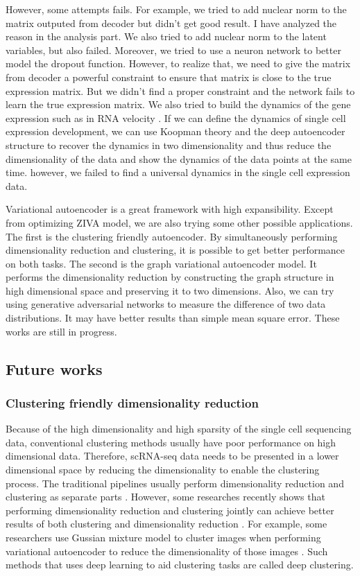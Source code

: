 However, some attempts fails. For example, we tried to add nuclear norm to the matrix outputed from decoder but didn't get good result. I have analyzed the reason in the analysis part. We also tried to add nuclear norm to the latent variables, but also failed. Moreover, we tried to use a neuron network to better model the dropout function. However, to realize that, we need to give the matrix from decoder a powerful constraint to ensure that matrix is close to the true expression matrix. But we didn't find a proper constraint and the network fails to learn the true expression matrix. We also tried to build the dynamics of the gene expression such as in RNA velocity \cite{la2018rna}. If we can define the dynamics of single cell expression development, we can use Koopman theory \cite{morton2018deep} and the deep autoencoder structure to recover the dynamics in two dimensionality \cite{lusch2018deep} and thus reduce the dimensionality of the data and show the dynamics of the data points at the same time. however, we failed to find a universal dynamics in the single cell expression data.  

Variational autoencoder is a great framework with high expansibility. Except from optimizing ZIVA model, we are also trying some other possible applications. The first is the clustering friendly autoencoder. By simultaneously performing dimensionality reduction and clustering, it is possible to get better performance on both tasks. The second is the graph variational autoencoder model. It performs the dimensionality reduction by constructing the graph structure in high dimensional space and preserving it to two dimensions. Also, we can try using generative adversarial networks to measure the difference of two data distributions. It may have better results than simple mean square error. These works are still in progress.

\subsection{Future works}

\subsubsection{Clustering friendly dimensionality reduction}
Because of the high dimensionality and high sparsity of the single cell sequencing data, conventional clustering methods usually have poor performance on high dimensional data. Therefore, scRNA-seq data needs to be presented in a lower dimensional space by reducing the dimensionality to enable the clustering process. The traditional pipelines usually perform dimensionality reduction and clustering as separate parts \cite{wu2020tools}. However, some researches recently shows that performing dimensionality reduction and clustering jointly can achieve better results of both clustering and dimensionality reduction \cite{yang2017towards}. For example, some researchers use Gussian mixture model to cluster images when performing variational autoencoder to reduce the dimensionality of those images \cite{prasad2020variational}. Such methods that uses deep learning to aid clustering tasks are called deep clustering.

